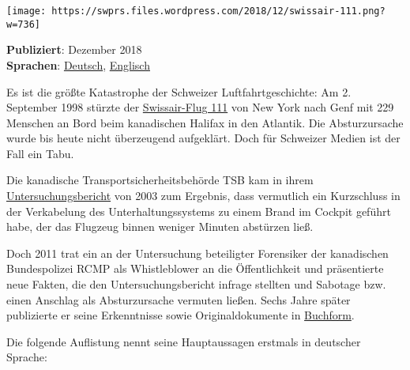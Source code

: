 \texttt{[image: https://swprs.files.wordpress.com/2018/12/swissair-111.png?w=736]}

\textbf{Publiziert}: Dezember 2018\\
\textbf{Sprachen}:
\href{https://swprs.org/der-absturz-swissair-111/}{Deutsch},
\href{https://swprs.org/the-crash-of-swissair-111/}{Englisch}

Es ist die größte Katastrophe der Schweizer Luftfahrtgeschichte: Am 2.
September 1998 stürzte der
\href{https://en.wikipedia.org/wiki/Swissair_Flight_111}{Swissair-Flug
111} von New York nach Genf mit 229 Menschen an Bord beim kanadischen
Halifax in den Atlantik. Die Absturzursache wurde bis heute nicht
überzeugend aufgeklärt. Doch für Schweizer Medien ist der Fall ein Tabu.

Die kanadische Transportsicherheitsbehörde TSB kam in ihrem
\href{http://www.tsb.gc.ca/eng/rapports-reports/aviation/1998/a98h0003/a98h0003.pdf}{Untersuchungsbericht}
von 2003 zum Ergebnis, dass vermutlich ein Kurzschluss in der
Verkabelung des Unterhaltungssystems zu einem Brand im Cockpit geführt
habe, der das Flugzeug binnen weniger Minuten abstürzen ließ.

Doch 2011 trat ein an der Untersuchung beteiligter Forensiker der
kanadischen Bundespolizei RCMP als Whistleblower an die Öffentlichkeit
und präsentierte neue Fakten, die den Untersuchungsbericht infrage
stellten und Sabotage bzw. einen Anschlag als Absturzursache vermuten
ließen. Sechs Jahre später publizierte er seine Erkenntnisse sowie
Original­dokumente in \href{http://www.swissair111.ca/}{Buchform}.

Die folgende Auflistung nennt seine Hauptaussagen erstmals in deutscher
Sprache:

